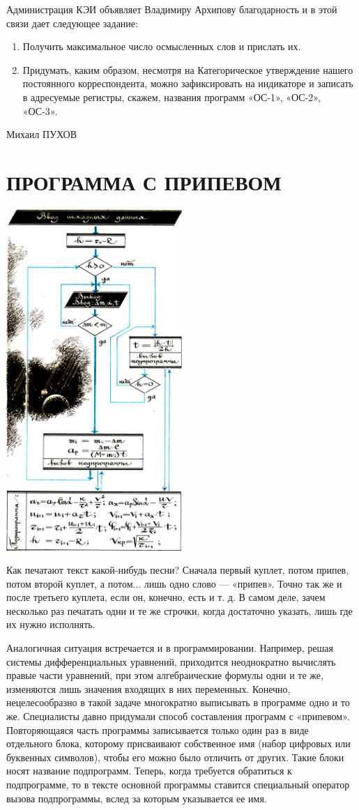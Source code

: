 \documentclass[11pt,a4paper,oneside]{article}
\begin{document}
Администрация КЭИ объявляет Владимиру Архипову благодарность и в этой связи дает следующее задание:
\begin{enumerate}
\item Получить максимальное число осмысленных слов и прислать их.
\item Придумать, каким образом, несмотря на Категорическое утверждение нашего постоянного корреспондента, можно зафиксировать на индикаторе и записать в адресуемые регистры, скажем, названия программ «ОС-1», «ОС-2», «ОС-3».
\end{enumerate}

Михаил ПУХОВ

\section{ПРОГРАММА С ПРИПЕВОМ}
\includegraphics[width=0.5\textwidth]{subprg}

Как печатают текст какой-нибудь песни? Сначала первый куплет, потом припев, потом второй куплет, а потом... лишь одно слово — «припев». Точно так же и после третьего куплета, если он, конечно, есть и т. д. В самом деле, зачем несколько раз печатать одни и те же строчки, когда достаточно указать, лишь где их нужно исполнять.

Аналогичная ситуация встречается и в программировании. Например, решая системы дифференциальных уравнений, приходится неоднократно вычислять правые части уравнений, при этом алгебраические формулы одни и те же, изменяются лишь значения входящих в них переменных. Конечно, нецелесообразно в такой задаче многократно выписывать в программе одно и то же. Специалисты давно придумали способ составления программ с «припевом». Повторяющаяся часть программы записывается только один раз в виде отдельного блока, которому присваивают собственное имя (набор цифровых или буквенных символов), чтобы его можно было отличить от других. Такие блоки носят название подпрограмм. Теперь, когда требуется обратиться к подпрограмме, то в тексте основной программы ставится специальный оператор вызова подпрограммы, вслед за которым указывается ее имя.
\end{document}
